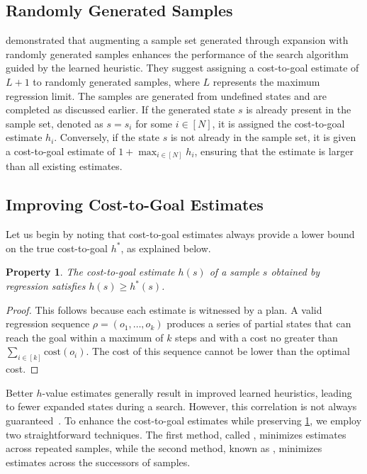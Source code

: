 \documentclass[ppgc,diss,english]{iiufrgs}
\newtheorem{property}{Property}
\begin{document}
\subsection{Randomly Generated Samples}
\label{sec:sample-random-samples}
\citet{OToole/2022} demonstrated that augmenting a sample set generated through expansion with randomly generated samples enhances the performance of the search algorithm guided by the learned heuristic. They suggest assigning a cost-to-goal estimate of $L+1$ to randomly generated samples, where $L$ represents the maximum regression limit.
The samples are generated from undefined states and are completed as discussed earlier. If the generated state $s$ is already present in the sample set, denoted as $s = s_i$ for some $i\in[N]$, it is assigned the cost-to-goal estimate $h_i$. Conversely, if the state $s$ is not already in the sample set, it is given a cost-to-goal estimate of $1+\max_{i\in[N]} h_i$, ensuring that the estimate is larger than all existing estimates.

\subsection{Improving Cost-to-Goal Estimates}
\label{sec:sample-improving-h}
Let us begin by noting that cost-to-goal estimates always provide a lower bound on the true cost-to-goal $h^{*}$, as explained below.

\begin{property}
\label{prop:hvalue}
The cost-to-goal estimate $h(s)$ of a sample $s$ obtained by regression satisfies $h(s)\geq h^*(s)$.
\end{property}

\begin{proof}
This follows because each estimate is witnessed by a plan.
A valid regression sequence $\rho=(o_1,\ldots,o_k)$ produces a series of partial states that can reach the goal within a maximum of $k$ steps and with a cost no greater than $\sum_{i\in[k]}\text{cost}(o_i)$. The cost of this sequence cannot be lower than the optimal cost.
\end{proof}

Better $h$-value estimates generally result in improved learned heuristics, leading to fewer expanded states during a search. However, this correlation is not always guaranteed~\cite{Holte/2010}. To enhance the cost-to-goal estimates while preserving \cref{prop:hvalue}, we employ two straightforward techniques. The first method, called \sai, minimizes estimates across repeated samples, while the second method, known as \sui, minimizes estimates across the successors of samples.
\end{document}
